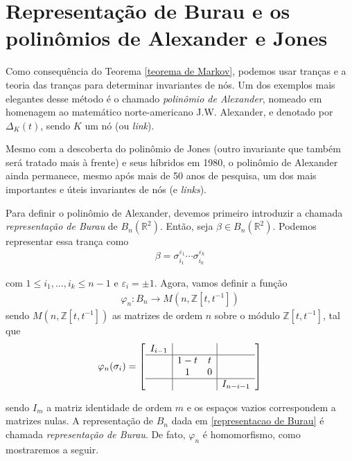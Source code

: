 \documentclass[a4paper,portuguese,11pt,twoside, leqno]{book}
\theoremstyle{definition}
\begin{document}
	\section{Representação de Burau e os polinômios de Alexander e Jones} 
	\hspace{12pt} Como consequência do Teorema \eqref{teorema de Markov}, podemos usar tranças e a teoria das tranças para determinar invariantes de nós. Um dos exemplos mais elegantes desse método é o chamado \textit{polinômio de Alexander}, nomeado em homenagem ao matemático norte-americano J.W. Alexander, e denotado por $\Delta_K(t)$, sendo $K$ um nó (ou \textit{link}).
	\par\vspace{0.3cm} Mesmo com a descoberta do polinômio de Jones (outro invariante que também será tratado mais à frente) e seus híbridos em 1980, o polinômio de Alexander ainda permanece, mesmo após mais de 50 anos de pesquisa, um dos mais importantes e úteis invariantes de nós (e \textit{links}).
	\par\vspace{0.3cm} Para definir o polinômio de Alexander, devemos primeiro introduzir a chamada \textit{representação de Burau} de $B_n(\mathbb{R}^2)$. Então, seja $\beta\in B_n(\mathbb{R}^2)$. Podemos representar essa trança como
	\begin{align*}
	\beta = \sigma_{i_1}^{\varepsilon_1}\cdots\sigma_{i_k}^{\varepsilon_k}
	\end{align*}
	\par\vspace{0.3cm} com $1\leq i_1, \dots, i_k\leq n-1$ e $\varepsilon_i = \pm1$. Agora, vamos definir a função
	\begin{align*}
	\varphi_n: B_n\to M(n, \mathbb{Z}[t, t^{-1}])
	\end{align*}
	sendo $M(n, \mathbb{Z}[t,t^{-1}])$ as matrizes de ordem $n$ sobre o módulo $\mathbb{Z}[t,t^{-1}]$, tal que
	\begin{equation}
	\label{representacao de Burau}
	\varphi_n(\sigma_i) = 
	\left[ 
	\begin{array}{c|cc|c}
	I_{i-1} &  &  & \\
	\hline 
	& 1-t & t &  \\
	& 1 & 0 &  \\ 
	\hline
	&  &  & I_{n-i-1}
	\end{array}
	\right] 
	\end{equation}
	\par\vspace{0.3cm} sendo $I_m$ a matriz identidade de ordem $m$ e os espaços vazios correspondem a matrizes nulas. A representação de $B_n$ dada em \eqref{representacao de Burau} é chamada \textit{representação de Burau}. De fato, $\varphi_n$ é homomorfismo, como mostraremos a seguir.
\end{document}
